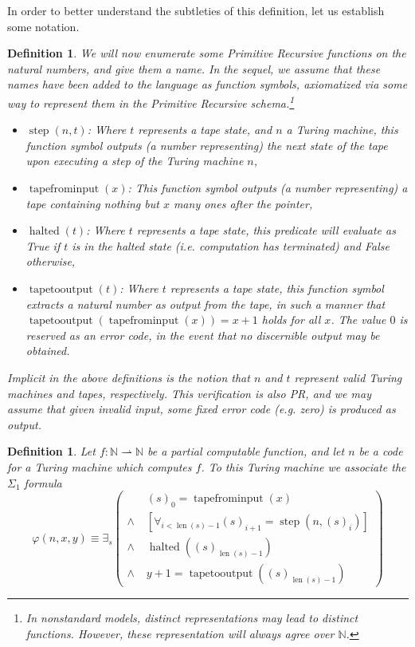 \documentclass{article}
\newtheorem{definition}[theorem]{Definition}
\theoremstyle{nonumberplain}
\newcommand{\N}{\mathbb{N}}
\DeclareMathOperator{\step}{step}
\DeclareMathOperator{\tapefrominput}{tapefrominput}
\DeclareMathOperator{\tapetooutput}{tapetooutput}
\DeclareMathOperator{\halted}{halted}
\DeclareMathOperator{\len}{len}
\begin{document}
In order to better understand the subtleties of this definition, let us establish some notation.
\begin{definition}
We will now enumerate some Primitive Recursive functions on the natural numbers, and give them a name. In the sequel, we assume that these names have been added to the language as function symbols, axiomatized via some way to represent them in the Primitive Recursive schema.\footnote{In nonstandard models, distinct representations may lead to distinct functions. However, these representation will always agree over $\N$.}
\begin{itemize}
\item $\step(n, t)$: Where $t$ represents a tape state, and $n$ a Turing machine, this function symbol outputs (a number representing) the next state of the tape upon executing a step of the Turing machine $n$,

\item $\tapefrominput(x)$: This function symbol outputs (a number representing) a tape containing nothing but $x$ many ones after the pointer,

\item $\halted(t)$: Where $t$ represents a tape state, this predicate will evaluate as True if $t$ is in the halted state (i.e. computation has terminated) and False otherwise,

\item $\tapetooutput(t)$: Where $t$ represents a tape state, this function symbol extracts a natural number as output from the tape, in such a manner that $\tapetooutput(\tapefrominput(x)) = x+1$ holds for all $x$. The value $0$ is reserved as an error code, in the event that no discernible output may be obtained.
\end{itemize}

Implicit in the above definitions is the notion that $n$ and $t$ represent valid Turing machines and tapes, respectively. This verification is also PR, and we may assume that given invalid input, some fixed error code (e.g. zero) is produced as output.
\end{definition}

\begin{definition}\label{def:phin}
Let $f \colon \N \rightharpoonup \N$ be a partial computable function, and let $n$ be a code for a Turing machine which computes $f$. To this Turing machine we associate the $\Sigma_1$ formula
\begin{equation}
\varphi(n,x,y) \equiv \exists_s \left(
\begin{aligned}
&(s)_0 = \tapefrominput(x)\\
\land \; &[\forall_{i < \len(s) - 1} (s)_{i+1} = \step(n, (s)_i)]\\
\land \; &\halted((s)_{\len(s)-1})\\
\land \; &y+1 = \tapetooutput((s)_{\len(s) - 1})
\end{aligned} \right)
\end{equation}
\end{definition}
\end{document}
